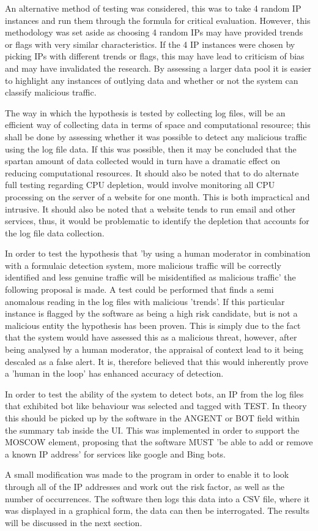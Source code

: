 An alternative method of testing was considered, this was to take 4 random IP instances and run them through the formula for critical evaluation. However, this methodology was set aside as choosing 4 random IPs may have provided trends or flags with very similar characteristics. If the 4 IP instances were chosen by picking IPs with different trends or flags, this may have lead to criticism of bias and may have invalidated the research. By assessing a larger data pool it is easier to highlight any instances of outlying data and whether or not the system can classify malicious traffic.

The way in which the hypothesis is tested by collecting log files, will be an efficient way of collecting data in terms of space and computational resource; this shall be done by assessing whether it was possible to detect any malicious traffic using the log file data. If this was possible, then it may be concluded that the spartan amount of data collected would in turn have a dramatic effect on reducing computational resources. It should also be noted that to do alternate full testing regarding CPU depletion, would involve monitoring all CPU processing on the server of a website for one month. This is both impractical and intrusive. It should also be noted that a website tends to run email and other services, thus, it would be problematic to identify the depletion that accounts for the log file data collection.

In order to test the hypothesis that 'by using a human moderator in combination with a formulaic detection system, more malicious traffic will be correctly identified and less genuine traffic will be misidentified as malicious traffic' the following proposal is made. A test could be performed that finds a semi anomalous reading in the log files with malicious 'trends'. If this particular instance is flagged by the software as being a high risk candidate, but is not a malicious entity the hypothesis has been proven. This is simply due to the fact that the system would have assessed this as a malicious threat, however, after being analysed by a human moderator, the appraisal of context lead to it being descaled as a false alert. It is, therefore believed that this would inherently prove a 'human in the loop' has enhanced accuracy of detection. 

In order to test the ability of the system to detect bots, an IP from the log files that exhibited bot like behaviour was selected and tagged with TEST. In theory this should be picked up by the software in the ANGENT or BOT field within the summary tab inside the UI. This was implemented in order to support the MOSCOW element, proposing that the software MUST 'be able to add or remove a known IP address' for services like google and Bing bots.

A small modification was made to the program in order to enable it to look through all of the IP addresses and work out the risk factor, as well as the number of occurrences. The software then logs this data into a CSV file, where it was displayed in a graphical form, the data can then be interrogated. The results will be discussed in the next section.